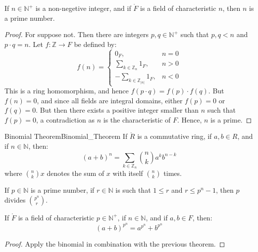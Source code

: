 \documentclass{article}                                                        %
\begin{document}
        \begin{theorem}
            If $n\in\mathbb{N}^{+}$ is a non-negetive integer, and if
            $\ring{F}$ is a field of characteristic $n$, then $n$ is a prime
            number.
        \end{theorem}
        \begin{proof}
            For suppose not. Then there are integers $p,q\in\mathbb{N}^{+}$ such
            that $p,q<n$ and $p\cdot{q}=n$. Let $f:\mathbb{Z}\rightarrow{F}$ be
            defined by:
            \begin{equation}
                f(n)=
                \begin{cases}
                    0_{F},&n=0\\
                    \sum_{k\in\mathbb{Z}_{n}}1_{F},&n>0\\
                    \minus\sum_{k\in\mathbb{Z}_{|n|}}1_{F},&n<0
                \end{cases}
            \end{equation}
            This is a ring homomorphism, and hence
            $f(p\cdot{q})=f(p)\cdot{f}(q)$. But $f(n)=0$, and since all fields
            are integral domains, either $f(p)=0$ or $f(q)=0$. But then there
            exists a positive integer smaller than $n$ such that $f(p)=0$,
            a contradiction as $n$ is the characteristic of $F$. Hence, $n$ is
            a prime.
        \end{proof}
        \begin{ftheorem}{Binomial Theorem}{Binomial_Theorem}
            If $\ring{R}$ is a commutative ring, if $a,b\in{R}$, and if
            $n\in\mathbb{N}$, then:
            \begin{equation*}
                (a+b)^{n}=\sum_{k\in\mathbb{Z}_{n}}\binom{n}{k}a^{k}b^{n-k}
            \end{equation*}
            where $\binom{n}{k}x$ denotes the sum of $x$ with itself
            $\binom{n}{k}$ times.
        \end{ftheorem}
        \begin{theorem}
            If $p\in\mathbb{N}$ is a prime number, if $r\in\mathbb{N}$ is such
            that $1\leq{r}$ and $r\leq{p}^{n}-1$, then $p$ divides
            $\binom{p^{n}}{r}$.
        \end{theorem}
        \begin{theorem}
            If $\ring{F}$ is a field of characteristic $p\in\mathbb{N}^{+}$,
            if $n\in\mathbb{N}$, and if $a,b\in{F}$, then:
            \begin{equation}
                (a+b)^{p^{n}}=a^{p^{n}}+b^{p^{n}}
            \end{equation}
        \end{theorem}
        \begin{proof}
            Apply the binomial in combination with the previous theorem.
        \end{proof}
\end{document}
